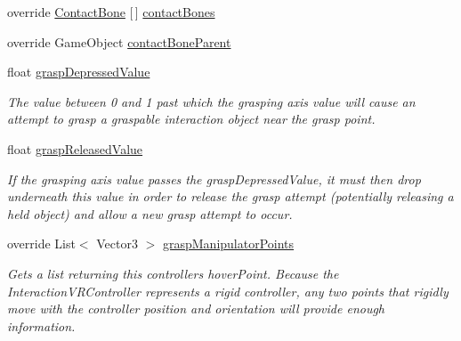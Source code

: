 \begin{DoxyCompactItemize}
override \mbox{\hyperlink{class_leap_1_1_unity_1_1_interaction_1_1_contact_bone}{Contact\+Bone}} \mbox{[}$\,$\mbox{]} \mbox{\hyperlink{class_leap_1_1_unity_1_1_interaction_1_1_interaction_x_r_controller_a97aebd084ca67cee40ef9f09a362394f}{contact\+Bones}}
\item 
override Game\+Object \mbox{\hyperlink{class_leap_1_1_unity_1_1_interaction_1_1_interaction_x_r_controller_a7dc27e56bd7d91b9af6bc5104b8cbd4e}{contact\+Bone\+Parent}}
\item 
float \mbox{\hyperlink{class_leap_1_1_unity_1_1_interaction_1_1_interaction_x_r_controller_aa003958b17f12b0c1cfe801649e45147}{grasp\+Depressed\+Value}}
\begin{DoxyCompactList}\small\item\em The value between 0 and 1 past which the grasping axis value will cause an attempt to grasp a graspable interaction object near the grasp point. \end{DoxyCompactList}\item 
float \mbox{\hyperlink{class_leap_1_1_unity_1_1_interaction_1_1_interaction_x_r_controller_aebfaa8d5cd025180c86947dcfb5c5cd8}{grasp\+Released\+Value}}
\begin{DoxyCompactList}\small\item\em If the grasping axis value passes the grasp\+Depressed\+Value, it must then drop underneath this value in order to release the grasp attempt (potentially releasing a held object) and allow a new grasp attempt to occur. \end{DoxyCompactList}\item 
override List$<$ Vector3 $>$ \mbox{\hyperlink{class_leap_1_1_unity_1_1_interaction_1_1_interaction_x_r_controller_a521422a5de1b36220698adc1c2b3da18}{grasp\+Manipulator\+Points}}
\begin{DoxyCompactList}\small\item\em Gets a list returning this controller\textquotesingle{}s hover\+Point. Because the Interaction\+V\+R\+Controller represents a rigid controller, any two points that rigidly move with the controller position and orientation will provide enough information. \end{DoxyCompactList}\end{DoxyCompactItemize}
